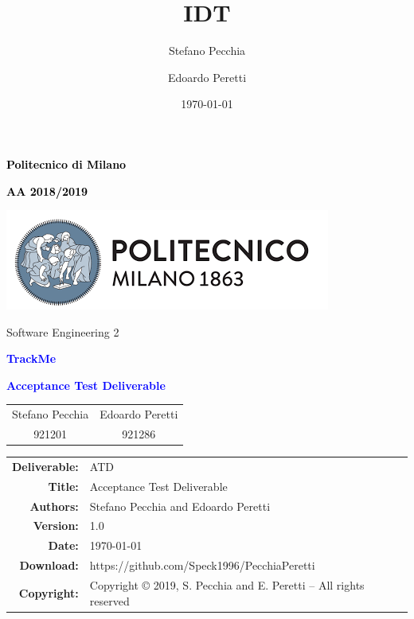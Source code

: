 \documentclass[11pt,a4paper]{article}
\title{IDT}
\author{Stefano Pecchia \and Edoardo Peretti}
\date{\today}
\begin{document}
\begin{titlepage}
\centering

\textcolor{black}{\textbf{Politecnico di Milano}} \par
\textcolor{black}{\textbf{AA 2018/2019}} \par  \vspace{2em}
\includegraphics[scale=0.7]{resources/PolimiLogo}\par \vspace{1em}

Software Engineering 2 \par \vspace{1.5cm}
\textcolor{Blue}{\Large\textbf{TrackMe}} \par \vspace{3cm}
 
{\textcolor{Blue}{\textbf{\Huge{Acceptance Test Deliverable}}}} \vfill
\renewcommand\tabcolsep{4.5em}
\begin{tabular}{cc}
Stefano Pecchia & Edoardo Peretti   \\
921201  & 921286
\end{tabular}
\renewcommand\tabcolsep{6pt}

\vspace{4cm}
\end{titlepage}


\begin{table}[h!]
\centering
\begin{tabular}{rl}
\hline
\textbf{Deliverable:} & ATD\\
\textbf{Title:} & Acceptance Test Deliverable\\
\textbf{Authors:} & Stefano Pecchia and Edoardo Peretti\\
\textbf{Version:} & 1.0 \\ 
\textbf{Date:} & \today \\
\textbf{Download:} & https://github.com/Speck1996/PecchiaPeretti \\
\textbf{Copyright:} & Copyright © 2019, S. Pecchia and E. Peretti – All rights reserved \\
\hline
\end{tabular}
\end{table}

\newpage
\tableofcontents





\end{document}
